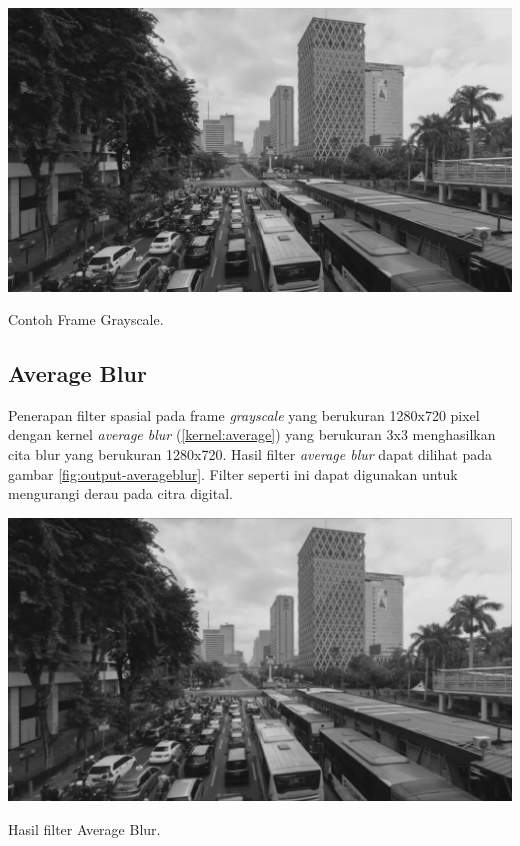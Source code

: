 \begin{afigure}
    \includegraphics[width=0.8\linewidth, center]{images/output-image/input1-grayscale.png}
    \caption{Contoh Frame Grayscale.}
    \label{fig:input-grayscale}
\end{afigure}

\subsection{Average Blur}
Penerapan filter spasial pada frame \textit{grayscale} yang berukuran 1280x720 pixel dengan kernel \textit{average blur} (\ref{kernel:average}) yang berukuran 3x3 menghasilkan cita blur yang berukuran 1280x720. Hasil filter \textit{average blur} dapat dilihat pada gambar \ref{fig:output-averageblur}. Filter seperti ini dapat digunakan untuk mengurangi derau pada citra digital.
\begin{afigure}
    \includegraphics[width=0.8\linewidth, center]{images/output-image/input1-averageblur.png}
    \caption{Hasil filter Average Blur.}
    \label{fig:output-averageblur}
\end{afigure}

